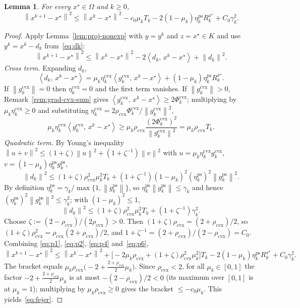 \documentclass[]{interact}
\theoremstyle{plain}
\newtheorem{lemma}[theorem]{Lemma}
\theoremstyle{definition}
\theoremstyle{remark}
\newcommand{\norm}[1]{\left\lVert #1 \right\rVert}
\newcommand{\inner}[2]{\left\langle #1,\, #2 \right\rangle}
\newcommand{\cvx}{\mathrm{cvx}}
\newcommand{\ps}{\mathrm{ps}}
\begin{document}
\begin{lemma}\label{lem:fejer}
For every $x^\star\in\Omega$ and $k\ge 0$,
\begin{equation}\label{eq:fejer}
\norm{x^{k+1}-x^\star}^2\le\norm{x^k-x^\star}^2-c_0\mu_k T_k-2(1-\mu_k)\eta^{\ps}_k R^{x^\star}_k+C_0\gamma_k^2 .
\end{equation}
\end{lemma}
\begin{proof}
Apply Lemma~\ref{lem:proj-nonexp} with $y=y^k$ and $z=x^\star\in K$ and use $y^k=x^k-d_k$ from~\eqref{eq:dk}:
\begin{equation}\label{eq:p1}
\norm{x^{k+1}-x^\star}^2\le\norm{x^k-x^\star}^2-2\inner{d_k}{x^k-x^\star}+\norm{d_k}^2 .
\end{equation}
\emph{Cross term.} Expanding $d_k$,
\begin{equation}\label{eq:p2}
\inner{d_k}{x^k-x^\star}=\mu_k\eta^{\cvx}_k\inner{g^{\cvx}_k}{x^k-x^\star}+(1-\mu_k)\eta^{\ps}_k R^{x^\star}_k .
\end{equation}
If $\norm{g^{\cvx}_k}=0$ then $\eta^{\cvx}_k=0$ and the first term vanishes. If $\norm{g^{\cvx}_k}>0$, Remark~\ref{rem:grad-cvx-sum} gives $\inner{g^{\cvx}_k}{x^k-x^\star}\ge 2\Phi^{\cvx}_k$; multiplying by $\mu_k\eta^{\cvx}_k\ge 0$ and substituting $\eta^{\cvx}_k=2\rho_{\cvx}\Phi^{\cvx}_k/\norm{g^{\cvx}_k}^2$,
\begin{equation}\label{eq:p4}
\mu_k\eta^{\cvx}_k\inner{g^{\cvx}_k}{x^k-x^\star}\ge\mu_k\rho_{\cvx}\frac{(2\Phi^{\cvx}_k)^2}{\norm{g^{\cvx}_k}^2}=\mu_k\rho_{\cvx}T_k .
\end{equation}
\emph{Quadratic term.} By Young's inequality $\norm{u+v}^2\le(1+\zeta)\norm{u}^2+(1+\zeta^{-1})\norm{v}^2$ with $u=\mu_k\eta^{\cvx}_k g^{\cvx}_k$, $v=(1-\mu_k)\eta^{\ps}_k g^{\ps}_k$,
\[
\norm{d_k}^2\le(1+\zeta)\rho_{\cvx}^2\mu_k^2 T_k+(1+\zeta^{-1})(1-\mu_k)^2(\eta^{\ps}_k)^2\norm{g^{\ps}_k}^2 .
\]
By definition $\eta^{\ps}_k=\gamma_k/\max\{1,\norm{g^{\ps}_k}\}$, so $\eta^{\ps}_k\norm{g^{\ps}_k}\le\gamma_k$ and hence $(\eta^{\ps}_k)^2\norm{g^{\ps}_k}^2\le\gamma_k^2$; with $(1-\mu_k)^2\le 1$,
\begin{equation}\label{eq:p6}
\norm{d_k}^2\le(1+\zeta)\rho_{\cvx}^2\mu_k^2 T_k+(1+\zeta^{-1})\gamma_k^2 .
\end{equation}
Choose $\zeta:=(2-\rho_{\cvx})/(2\rho_{\cvx})>0$. Then $(1+\zeta)\rho_{\cvx}=(2+\rho_{\cvx})/2$, so $(1+\zeta)\rho_{\cvx}^2=\rho_{\cvx}(2+\rho_{\cvx})/2$, and $1+\zeta^{-1}=(2+\rho_{\cvx})/(2-\rho_{\cvx})=C_0$. Combining \eqref{eq:p1}, \eqref{eq:p2}, \eqref{eq:p4} and~\eqref{eq:p6},
\[
\norm{x^{k+1}-x^\star}^2\le\norm{x^k-x^\star}^2+\bigl[-2\mu_k\rho_{\cvx}+(1+\zeta)\rho_{\cvx}^2\mu_k^2\bigr]T_k-2(1-\mu_k)\eta^{\ps}_k R^{x^\star}_k+C_0\gamma_k^2 .
\]
The bracket equals $\mu_k\rho_{\cvx}\bigl(-2+\tfrac{2+\rho_{\cvx}}{2}\mu_k\bigr)$. Since $\rho_{\cvx}<2$, for all $\mu_k\in[0,1]$ the factor $-2+\tfrac{2+\rho_{\cvx}}{2}\mu_k$ is at most $-(2-\rho_{\cvx})/2<0$ (its maximum over $[0,1]$ is at $\mu_k=1$); multiplying by $\mu_k\rho_{\cvx}\ge0$ gives the bracket $\le -c_0\mu_k$. This yields~\eqref{eq:fejer}.
\end{proof}
\end{document}
